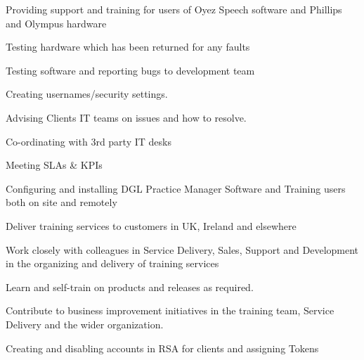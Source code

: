 \documentclass[a4paper]{deedy-resume}
\begin{document}
\begin{minipage}[t]{0.60\textwidth}

\item Providing support and training for users of Oyez Speech software and Phillips and Olympus hardware 
\sectionspace
\begin{tightitemize}
\item Testing hardware which has been returned for any faults 
\item Testing software and reporting bugs to development team 
\item Creating usernames/security settings.
\item Advising Clients IT teams on issues and how to resolve.
\item Co-ordinating with 3rd party IT desks
\item Meeting SLAs \& KPIs
\end{tightitemize}

\sectionspace %


\item Configuring and installing DGL Practice Manager Software and Training users both on site and remotely 
\sectionspace
\begin{tightitemize}
\item Deliver training services to customers in UK, Ireland and elsewhere
\item Work closely with colleagues in Service Delivery, Sales, Support and
Development in the organizing and delivery of training services
\item Learn and self-train on products and releases as required.
\item Contribute to business improvement initiatives in the training team, Service Delivery and the wider organization.
\item Creating and disabling accounts in RSA for clients and assigning Tokens
\end{tightitemize}
\sectionspace %


\end{minipage} %
\end{document}
